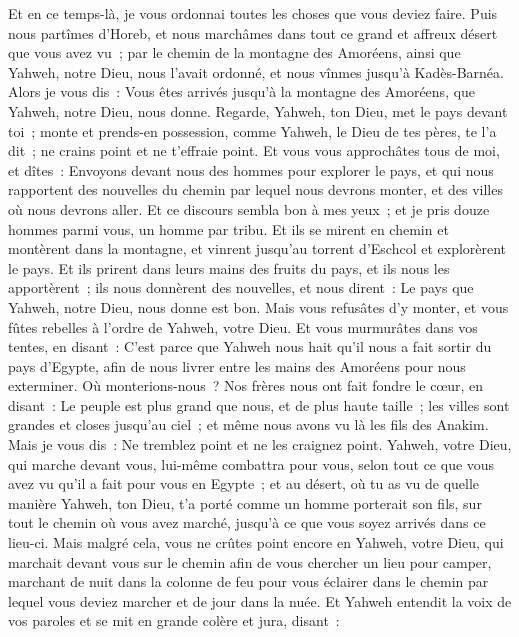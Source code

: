 \begin{multicols}{2}
Et en ce temps-là, je vous ordonnai toutes les choses que vous deviez faire.
Puis nous partîmes d'Horeb, et nous marchâmes dans tout ce grand et affreux désert que vous avez vu~; par le chemin de la montagne des Amoréens, ainsi que Yahweh, notre Dieu, nous l'avait ordonné, et nous vînmes jusqu'à Kadès-Barnéa.
Alors je vous dis~: Vous êtes arrivés jusqu'à la montagne des Amoréens, que Yahweh, notre Dieu, nous donne.
Regarde, Yahweh, ton Dieu, met le pays devant toi~; monte et prends-en possession, comme Yahweh, le Dieu de tes pères, te l'a dit~; ne crains point et ne t'effraie point.
Et vous vous approchâtes tous de moi, et dîtes~: Envoyons devant nous des hommes pour explorer le pays, et qui nous rapportent des nouvelles du chemin par lequel nous devrons monter, et des villes où nous devrons aller.
Et ce discours sembla bon à mes yeux~; et je pris douze hommes parmi vous, un homme par tribu.
Et ils se mirent en chemin et montèrent dans la montagne, et vinrent jusqu'au torrent d'Eschcol et explorèrent le pays.
Et ils prirent dans leurs mains des fruits du pays, et ils nous les apportèrent~; ils nous donnèrent des nouvelles, et nous dirent~: Le pays que Yahweh, notre Dieu, nous donne est bon. 
Mais vous refusâtes d'y monter, et vous fûtes rebelles à l'ordre de Yahweh, votre Dieu.
Et vous murmurâtes dans vos tentes, en disant~: C'est parce que Yahweh nous hait qu'il nous a fait sortir du pays d'Egypte, afin de nous livrer entre les mains des Amoréens pour nous exterminer.
Où monterions-nous~? Nos frères nous ont fait fondre le cœur, en disant~: Le peuple est plus grand que nous, et de plus haute taille~; les villes sont grandes et closes jusqu'au ciel~; et même nous avons vu là les fils des Anakim.
Mais je vous dis~: Ne tremblez point et ne les craignez point.
Yahweh, votre Dieu, qui marche devant vous, lui-même combattra pour vous, selon tout ce que vous avez vu qu'il a fait pour vous en Egypte~;
et au désert, où tu as vu de quelle manière Yahweh, ton Dieu, t'a porté comme un homme porterait son fils, sur tout le chemin où vous avez marché, jusqu'à ce que vous soyez arrivés dans ce lieu-ci.
Mais malgré cela, vous ne crûtes point encore en Yahweh, votre Dieu,
qui marchait devant vous sur le chemin afin de vous chercher un lieu pour camper, marchant de nuit dans la colonne de feu pour vous éclairer dans le chemin par lequel vous deviez marcher et de jour dans la nuée.
Et Yahweh entendit la voix de vos paroles et se mit en grande colère et jura, disant~:

\end{multicols}
